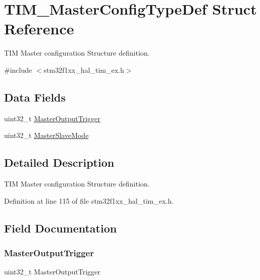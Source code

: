\hypertarget{struct_t_i_m___master_config_type_def}{}\section{T\+I\+M\+\_\+\+Master\+Config\+Type\+Def Struct Reference}
\label{struct_t_i_m___master_config_type_def}


T\+IM Master configuration Structure definition.  




{\ttfamily \#include $<$stm32f1xx\+\_\+hal\+\_\+tim\+\_\+ex.\+h$>$}

\subsection*{Data Fields}
\begin{DoxyCompactItemize}
\item 
uint32\+\_\+t \hyperlink{struct_t_i_m___master_config_type_def_aafb70c2c7a9a93a3dad59a350df2b00f}{Master\+Output\+Trigger}
\item 
uint32\+\_\+t \hyperlink{struct_t_i_m___master_config_type_def_aa17903ecbee15ce7a6d51de5e9602d3f}{Master\+Slave\+Mode}
\end{DoxyCompactItemize}


\subsection{Detailed Description}
T\+IM Master configuration Structure definition. 

Definition at line 115 of file stm32f1xx\+\_\+hal\+\_\+tim\+\_\+ex.\+h.



\subsection{Field Documentation}
\mbox{\label{struct_t_i_m___master_config_type_def_aafb70c2c7a9a93a3dad59a350df2b00f}} 
\subsubsection{\texorpdfstring{Master\+Output\+Trigger}{MasterOutputTrigger}}
{\footnotesize\ttfamily uint32\+\_\+t Master\+Output\+Trigger}

